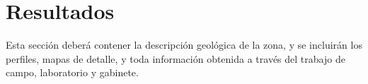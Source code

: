 \setcounter{figure}{0} %
\renewcommand{\thefigure}{\thesection.\arabic{figure}}
\chapter{Resultados}
Esta sección deberá contener la descripción geológica de la zona, y se incluirán los perfiles, mapas de detalle, y toda información obtenida a través del trabajo de campo, laboratorio y gabinete.

